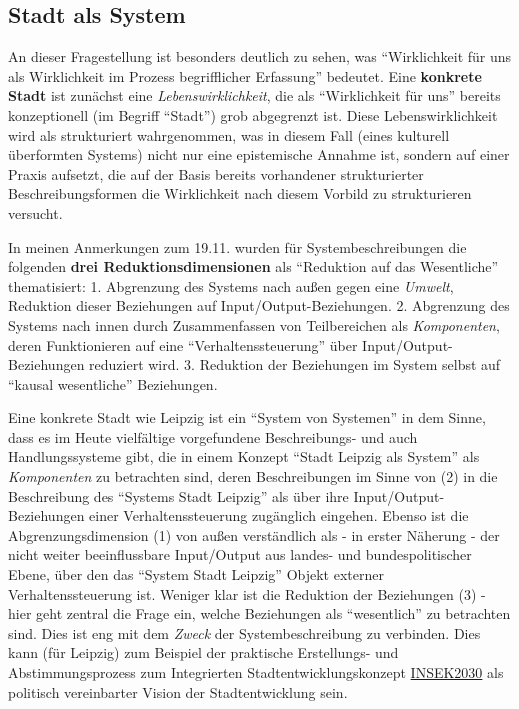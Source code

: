 \documentclass[11pt,a4paper]{article}
\begin{document}
\hypertarget{stadt-als-system}{%
\subsection{Stadt als System}\label{stadt-als-system}}

An dieser Fragestellung ist besonders deutlich zu sehen, was
``Wirklichkeit für uns als Wirklichkeit im Prozess begrifflicher
Erfassung'' bedeutet. Eine \textbf{konkrete Stadt} ist zunächst eine
\emph{Lebenswirklichkeit}, die als ``Wirklichkeit für uns'' bereits
konzeptionell (im Begriff ``Stadt'') grob abgegrenzt ist. Diese
Lebenswirklichkeit wird als strukturiert wahrgenommen, was in diesem
Fall (eines kulturell überformten Systems) nicht nur eine epistemische
Annahme ist, sondern auf einer Praxis aufsetzt, die auf der Basis
bereits vorhandener strukturierter Beschreibungsformen die Wirklichkeit
nach diesem Vorbild zu strukturieren versucht.

In meinen Anmerkungen zum 19.11. wurden für Systembeschreibungen die
folgenden \textbf{drei Reduktionsdimensionen} als ``Reduktion auf das
Wesentliche'' thematisiert: 1. Abgrenzung des Systems nach außen gegen
eine \emph{Umwelt}, Reduktion dieser Beziehungen auf
Input/Output-Beziehungen. 2. Abgrenzung des Systems nach innen durch
Zusammenfassen von Teilbereichen als \emph{Komponenten}, deren
Funktionieren auf eine ``Verhaltenssteuerung'' über
Input/Output-Beziehungen reduziert wird. 3. Reduktion der Beziehungen im
System selbst auf ``kausal wesentliche'' Beziehungen.

Eine konkrete Stadt wie Leipzig ist ein ``System von Systemen'' in dem
Sinne, dass es im Heute vielfältige vorgefundene Beschreibungs- und auch
Handlungssysteme gibt, die in einem Konzept ``Stadt Leipzig als System''
als \emph{Komponenten} zu betrachten sind, deren Beschreibungen im Sinne
von (2) in die Beschreibung des ``Systems Stadt Leipzig'' als über ihre
Input/Output-Beziehungen einer Verhaltenssteuerung zugänglich eingehen.
Ebenso ist die Abgrenzungsdimension (1) von außen verständlich als - in
erster Näherung - der nicht weiter beeinflussbare Input/Output aus
landes- und bundespolitischer Ebene, über den das ``System Stadt
Leipzig'' Objekt externer Verhaltenssteuerung ist. Weniger klar ist die
Reduktion der Beziehungen (3) - hier geht zentral die Frage ein, welche
Beziehungen als ``wesentlich'' zu betrachten sind. Dies ist eng mit dem
\emph{Zweck} der Systembeschreibung zu verbinden. Dies kann (für
Leipzig) zum Beispiel der praktische Erstellungs- und Abstimmungsprozess
zum Integrierten Stadtentwicklungskonzept
\href{https://www.leipzig.de/bauen-und-wohnen/stadtentwicklung/stadtentwicklungskonzept-insek/}{INSEK2030}
als politisch vereinbarter Vision der Stadtentwicklung sein.
\end{document}
